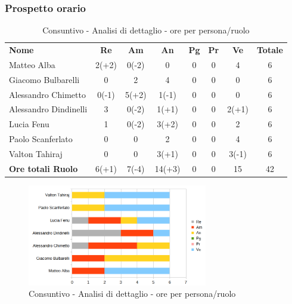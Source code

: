 \subsubsection{Prospetto orario}
	\begin{table} [h!]
	\begin{center}
		\begin{tabular} {m{3.5cm} c c c c c c c  }
			\rowcolor{lightgray}
			\textbf{Nome} & \textbf{Re} & \textbf{Am} & \textbf{An} & \textbf{Pg} & \textbf{Pr} & \textbf{Ve} & \textbf{Totale} \\
			Matteo Alba               & 2(+2) & 0(-2) & 0      & 0  & 0  & 4      & 6 \\
			Giacomo Bulbarelli        & 0     & 2     & 4      & 0  & 0  & 0      & 6 \\
			Alessandro Chimetto       & 0(-1) & 5(+2) & 1(-1)  & 0  & 0  & 0      & 6 \\
			Alessandro Dindinelli     & 3     & 0(-2) & 1(+1)  & 0  & 0  & 2(+1)  & 6 \\
			Lucia Fenu                & 1     & 0(-2) & 3(+2)  & 0  & 0  & 2      & 6 \\
			Paolo Scanferlato         & 0     & 0     & 2      & 0  & 0  & 4      & 6 \\
			Valton Tahiraj            & 0     & 0     & 3(+1)  & 0  & 0  & 3(-1)  & 6\\
			\textbf{Ore totali Ruolo} & 6(+1) & 7(-4) & 14(+3) & 0  & 0  & 15     & 42
		\end{tabular}
		\caption{Consuntivo - Analisi di dettaglio - ore per persona/ruolo}
	\end{center}
\end{table}

	\begin{figure} [h!]
	\centering
	\includegraphics[width=0.7\textwidth]{res/img/grafici/consuntivo-barre- ore analisi dettaglio.png}
	\caption{Consuntivo - Analisi di dettaglio -  ore per persona/ruolo} 
\end{figure}

